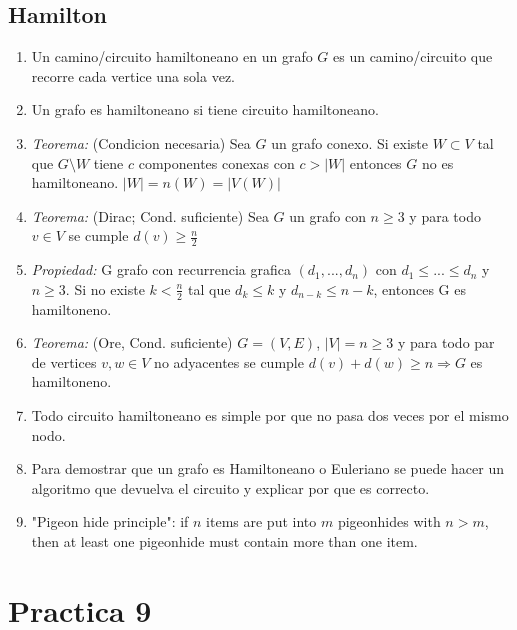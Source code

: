 \documentclass[a4paper, 11pt]{article}
\begin{document}
\subsection{Hamilton}
\begin{enumerate}
\item Un camino/circuito hamiltoneano en un grafo $G$ es un camino/circuito que recorre cada vertice una sola vez.
\item Un grafo es hamiltoneano si tiene circuito hamiltoneano.
\item \textit{Teorema:} (Condicion necesaria) Sea $G$ un grafo conexo. Si existe $ W \subset V$ tal que $G \setminus W$ tiene $c$ componentes conexas con $c > |W|$ entonces $G$ no es hamiltoneano. ${|W| = n(W) = |V(W)| }$
\item \textit{Teorema:} (Dirac; Cond. suficiente) Sea $G$ un grafo con $n \geq 3$ y para todo $v \in V$ se cumple $d(v) \geq \frac{n}{2}$
\item \textit{Propiedad:} G grafo con recurrencia grafica $(d_{1},...,d_{n})$ con $d_{1} \leq ... \leq d_{n}$ y $n \geq 3$. Si no existe $k < \frac{n}{2}$ tal que $d_{k} \leq k$ y $d_{n-k} \leq n-k$, entonces G es hamiltoneno.
\item \textit{Teorema:} (Ore, Cond. suficiente) $G=(V,E)$, $|V| = n \geq 3$ y para todo par de vertices $v,w \in V$ no adyacentes se cumple $d(v)+d(w)\geq n \Rightarrow G$ es hamiltoneno.
\item Todo circuito hamiltoneano es simple por que no pasa dos veces por el mismo nodo.
\item Para demostrar que un grafo es Hamiltoneano o Euleriano se puede hacer un algoritmo que devuelva el circuito y explicar por que es correcto.
\item "Pigeon hide principle": if $n$ items are put into $m$ pigeonhides with $n>m$, then at least one pigeonhide must contain more than one item.
\end{enumerate}

\section{Practica 9}
\end{document}
